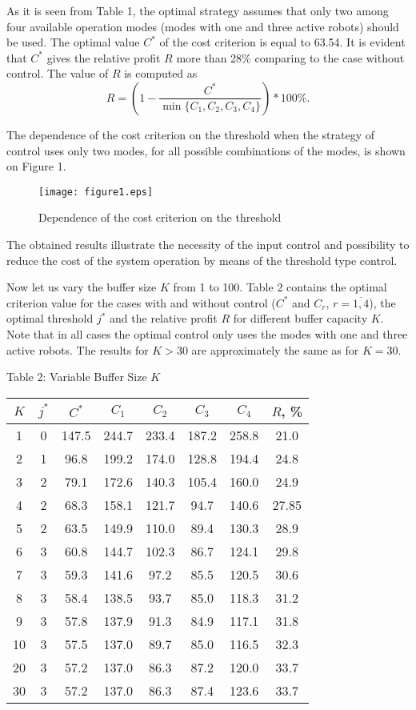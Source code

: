 \documentclass[11pt]{article}
\begin{document}
As it is seen from Table 1, the optimal strategy assumes that only
 two among four available operation
modes (modes with one and three active robots) should be used. The
optimal value $C^*$ of the cost criterion is equal to 63.54. It is
evident that $C^*$ gives the relative profit $R$ more than 28\%
comparing to the case without control. The value of $R$ is computed
as
$$R=\left(1-\frac{C^*}{\min\{C_1,C_2,C_3,C_4\}}\right)*100\%.$$

The dependence of the cost criterion on the threshold when the
strategy of control  uses only two modes, for all possible
combinations of the modes, is shown on Figure 1.

\begin{figure}[htb]
\centering \texttt{[image: figure1.eps]}\\
  \caption{Dependence of the cost criterion on the threshold}
\end{figure}


The obtained results illustrate the necessity of the input control
and possibility to reduce the cost of the system operation by means
of the threshold type control.

Now let  us vary the buffer size $K$  from 1 to 100. Table 2
contains the optimal criterion value for the cases with and without
control ($C^*$ and $C_r$, $r=\overline{1,4}$), the optimal threshold
$j^*$ and the relative profit $R$ for different buffer capacity $K$.
Note that in all cases the optimal control only uses the modes with
one and three active robots. The results for $K>30$ are
approximately the same as for $K=30$.

\newpage
\begin{center}
Table 2: Variable Buffer Size $K$
\\ \vspace{2mm}
\begin{tabular}{|c|c|c|c|c|c|c|c|}
  \hline
$K$ & $j^*$ & $C^*$ & $C_1$ & $C_2$ & $C_3$ & $C_4$ & $R$, \% \\
  \hline
  1 & 0 & 147.5& 244.7 & 233.4 & 187.2 & 258.8 & 21.0 \\
  2 & 1 & 96.8 & 199.2 & 174.0 & 128.8 & 194.4 & 24.8 \\
  3 & 2 & 79.1 & 172.6 & 140.3 & 105.4 & 160.0 & 24.9 \\
  4 & 2 & 68.3 & 158.1 & 121.7 & 94.7 & 140.6 & 27.85\\
  5 & 2 & 63.5 & 149.9 & 110.0 & 89.4 & 130.3 & 28.9 \\
  6 & 3 & 60.8 & 144.7 & 102.3 & 86.7 & 124.1 & 29.8 \\
  7 & 3 & 59.3 & 141.6 & 97.2 & 85.5 & 120.5 & 30.6 \\
  8 & 3 & 58.4 & 138.5 & 93.7 & 85.0 & 118.3 & 31.2 \\
  9 & 3 & 57.8 & 137.9 & 91.3 & 84.9 & 117.1 & 31.8\\
10 & 3  & 57.5 & 137.0 & 89.7 & 85.0 & 116.5 & 32.3 \\
20 & 3  & 57.2 & 137.0 & 86.3 & 87.2 & 120.0 & 33.7\\
30 & 3  & 57.2 & 137.0 & 86.3 & 87.4 & 123.6 & 33.7\\
  \hline
\end{tabular}\end{center}
\end{document}
